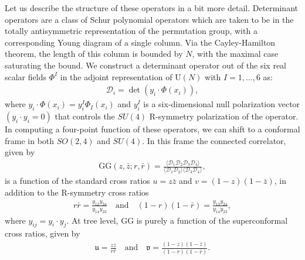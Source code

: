 \documentclass[a4paper,11pt]{article}
\theoremstyle{plain}
\theoremstyle{definition}
\theoremstyle{remark}
\newcommand{\ba}{\begin{equation} \begin{aligned}}
\newcommand{\ea}{\end{aligned} \end{equation}}
\newcommand{\U}{\textrm{U}}
\begin{document}
Let us describe the structure of these operators in a bit more detail. Determinant operators are a class of Schur polynomial operators which are taken to be in the totally antisymmetric representation of the permutation group, with a corresponding Young diagram of a single column. Via the Cayley-Hamilton theorem, the length of this column is bounded by $N$, with the maximal case saturating the bound. We construct a determinant operator out of the six real scalar fields $\Phi^I$ in the adjoint representation of $\U(N)$ with $I = 1,...,6$ as:
\ba
\mathcal{D}_i = \det\left(y_i \cdot\Phi(x_i) \right),
\ea
where $y_i \cdot \Phi(x_i) = y_i^I \Phi_I(x_i)$ and $y_i^I$ is a six-dimensional null polarization vector $(y_i \cdot y_i = 0)$ that controls the $SU(4)$ R-symmetry polarization of the operator. In computing a four-point function of these operators, we can shift to a conformal frame in both $SO(2,4)$ and $SU(4)$. In this frame the connected correlator, given by
\ba
\mathrm{GG}(z,\bar{z}; r,\bar{r}) = \frac{\langle \mathcal{D}_1 \mathcal{D}_2 \mathcal{D}_3\mathcal{D}_4 \rangle}{\langle \mathcal{D}_1 \mathcal{D}_2 \rangle \langle \mathcal{D}_3\mathcal{D}_4 \rangle },
\ea
is a function of the standard cross ratios $ u = z \bar{z}$ and $v = (1-z)(1-\bar{z})$, in addition to the R-symmetry cross ratios
\ba
r \bar{r} = \frac{y_{12} y_{34}}{y_{14}y_{23}} \quad \text{and} \quad (1-r)(1- \bar{r} )= \frac{y_{13} y_{24}}{y_{14}y_{23}},
\ea
where $y_{ij} = y_i \cdot y_j$. At tree level, $\mathrm{GG}$ is purely a function of the superconformal cross ratios, given by
\ba
\mathfrak{u} = \frac{z \bar{z}}{r \bar{r}} \quad \text{and} \quad \mathfrak{v} =  \frac{(1-z)(1- \bar{z})}{(1-r)(1- \bar{r})}.
\ea
\end{document}
